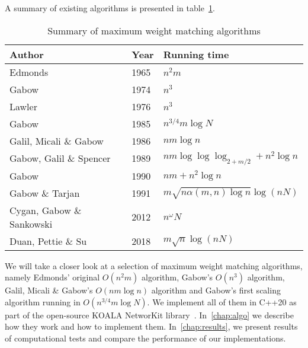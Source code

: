 A summary of existing algorithms is presented in table~\ref{tab:complexity}.

\begin{table}
\centering
\begin{tabular}{|l|l|l|}
\hline
Author & Year & Running time \\
\hline
Edmonds & 1965 & $n^2m$ \\
\hline
Gabow & 1974 & $n^3$ \\
\hline
Lawler & 1976 & $n^3$ \\
\hline
Gabow & 1985 & $n^{3/4}m \log N$ \\
\hline
Galil, Micali \& Gabow & 1986 & $nm \log n$ \\
\hline
Gabow, Galil \& Spencer & 1989 & $nm \log \log \log_{2 + m/2} + n^2\log n$ \\
\hline
Gabow & 1990 & $nm + n^2 \log n$ \\
\hline
Gabow \& Tarjan & 1991 & $m \sqrt{n \alpha(m, n) \log n} \log (nN)$ \\
\hline
Cygan, Gabow \& Sankowski & 2012 & $n^\omega N$ \\
\hline
Duan, Pettie \& Su & 2018 & $m \sqrt{n} \log(nN)$ \\
\hline
\end{tabular}
\caption{Summary of maximum weight matching algorithms}\label{tab:complexity}
\end{table}

We will take a closer look at a selection of maximum weight matching algorithms, namely Edmonds' original $O(n^2m)$ algorithm, Gabow's $O(n^3)$ algorithm, Galil, Micali \& Gabow's $O(nm \log n)$ algorithm and Gabow's first scaling algorithm running in $O(n^{3/4}m \log N)$. We implement all of them in C++20 as part of the open-source KOALA NetworKit library~\cite{koala-networkit}. In~\autoref{chap:algo} we describe how they work and how to implement them. In~\autoref{chap:results}, we present results of computational tests and compare the performance of our implementations.
